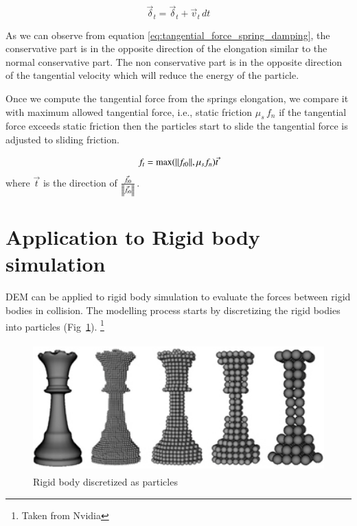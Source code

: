 \begin{equation*}
  \vec{\delta}_t = \vec{\delta}_t + \vec{v}_t \, dt
\end{equation*}

As we can observe from equation \ref{eq:tangential_force_spring_damping},
the conservative part is in the opposite direction of the elongation similar
to the normal conservative part. The non conservative part is in the opposite
direction of the tangential velocity which will reduce the energy of the
particle.

Once we compute the tangential force from the springs elongation, we compare it
with maximum allowed tangential force, i.e., static friction $\mu_s \, f_n$ if
the tangential force exceeds static friction then the particles start to slide
the tangential force is adjusted to sliding friction.

\begin{equation}
  \label{eq:tangential_force_spring_damping}
  f_t = \max(\norm{f_{t0}}, \mu_s f_n) \vec{t}
\end{equation}
where $\vec{t}$ is the direction of $\frac{\vec{f}_{t0}}{\norm{\vec{f}_{t0}}}$.



\section{Application to Rigid body simulation}
\label{sec:appl-rigid-body}

DEM can be applied to rigid body simulation to evaluate the forces between rigid
bodies in collision. The modelling process starts by discretizing the rigid
bodies into particles (Fig~\ref{fig:rigid_body_particles}).
\footnote{Taken from Nvidia}
\begin{figure}[ht]
  \label{fig:rigid_body_particles}
  \centering
  \includegraphics[width=0.9\linewidth, height=5cm]{dem/doc_images/grid_to_particles}
  \caption{Rigid body discretized as particles}
\end{figure}


